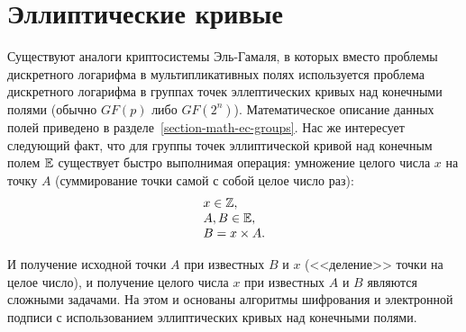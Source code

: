 \section{Эллиптические кривые}\label{section-elliptic-curve-cryptosystems}

Существуют аналоги криптосистемы Эль-Гамаля, в которых вместо проблемы дискретного логарифма в мультипликативных полях используется проблема дискретного логарифма в группах точек эллептических кривых над конечными полями (обычно $GF(p)$ либо $GF(2^n)$). Математическое описание данных полей приведено в разделе~\ref{section-math-ec-groups}. Нас же интересует следующий факт, что для группы точек эллиптической кривой над конечным полем $\mathbb{E}$ существует быстро выполнимая операция: умножение целого числа $x$ на точку $A$ (суммирование точки самой с собой целое число раз):
\[ \begin{array}{l}
	x \in \mathbb{Z}, \\
	A, B \in \mathbb{E}, \\
	B = x \times A. \\
\end{array} \]

И получение исходной точки $A$ при известных $B$ и $x$ (<<деление>> точки на целое число), и получение целого числа $x$ при известных $A$ и $B$ являются сложными задачами. На этом и основаны алгоритмы шифрования и электронной подписи с использованием эллиптических кривых над конечными полями.




